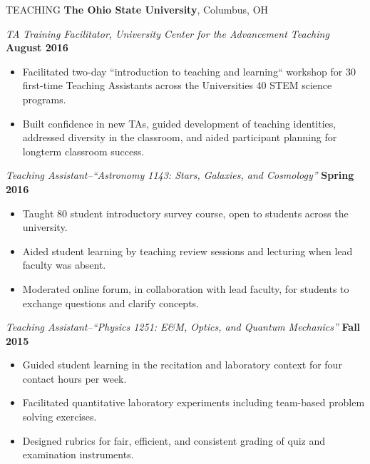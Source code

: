 \documentclass{resume} %
\begin{document}
\begin{rSection}{TEACHING}
{\bf The Ohio State University}, Columbus, OH 

{\em TA Training Facilitator, University Center for the Advancement Teaching} \hfill {\bf August 2016}
\begin{itemize}
\vspace*{-.05in}
\item Facilitated two-day ``introduction to teaching and learning`` workshop for 30 first-time Teaching Assistants across the Universities 40 STEM science programs.
\item Built confidence in new TAs, guided development of teaching identities, addressed diversity in the classroom, and aided participant planning for longterm classroom success.
\end{itemize}
{\em Teaching Assistant--``Astronomy 1143: Stars, Galaxies, and Cosmology''} \hfill {\bf Spring 2016}
\begin{itemize}
\vspace*{-.05in}
\item Taught 80 student introductory survey course, open to students across the university.
\item Aided student learning by teaching review sessions and lecturing when lead faculty was absent.
\item Moderated online forum, in collaboration with lead faculty, for students to exchange questions and clarify concepts.
\end{itemize}
{\em Teaching Assistant--``Physics 1251: E\&M, Optics, and Quantum Mechanics''} \hfill {\bf Fall 2015}
\begin{itemize}
\vspace*{-.05in}
\item Guided student learning in the recitation and laboratory context for four contact hours per week.
\item Facilitated quantitative laboratory experiments including team-based problem solving exercises.
\item Designed rubrics for fair, efficient, and consistent grading of quiz and examination instruments.
\end{itemize}
\end{rSection}
\end{document}
